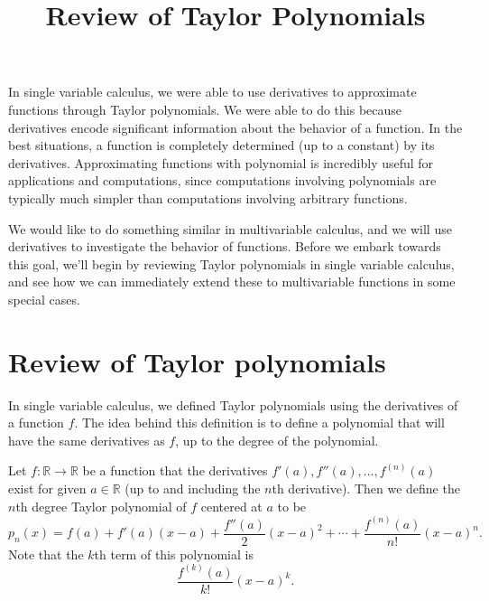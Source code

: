 \documentclass{ximera}
\title{Review of Taylor Polynomials}
\begin{document}
\begin{abstract}
\end{abstract}
\maketitle

In single variable calculus, we were able to use derivatives to approximate functions through Taylor polynomials. We were able to do this because derivatives encode significant information about the behavior of a function. In the best situations, a function is completely determined (up to a constant) by its derivatives. Approximating functions with polynomial is incredibly useful for applications and computations, since computations involving polynomials are typically much simpler than computations involving arbitrary functions. 

We would like to do something similar in multivariable calculus, and we will use derivatives to investigate the behavior of functions. Before we embark towards this goal, we'll begin by reviewing Taylor polynomials in single variable calculus, and see how we can immediately extend these to multivariable functions in some special cases.

\section*{Review of Taylor polynomials}

In single variable calculus, we defined Taylor polynomials using the derivatives of a function $f$. The idea behind this definition is to define a polynomial that will have the same derivatives as $f$, up to the degree of the polynomial.

\begin{definition}
Let $f:\mathbb{R}\rightarrow\mathbb{R}$ be a function that the derivatives $f'(a),f''(a),...,f^{(n)}(a)$ exist for given $a\in\mathbb{R}$ (up to and including the $n$th derivative). Then we define the $n$th degree Taylor polynomial of $f$ centered at $a$ to be
\[
p_n(x)=f(a) + f'(a)(x-a) + \frac{f''(a)}{2}(x-a)^2+\cdots + \frac{f^{(n)}(a)}{n!}(x-a)^n.
\]
Note that the $k$th term of this polynomial is
\[
\frac{f^{(k)}(a)}{k!}(x-a)^k.
\]
\end{definition}
\end{document}

